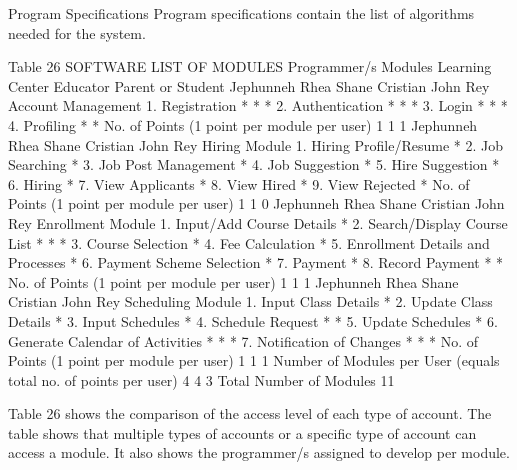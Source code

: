 Program Specifications  
Program specifications contain the list of algorithms needed for the system.

Table 26
SOFTWARE LIST OF MODULES
Programmer/s	Modules	Learning Center	Educator	Parent or Student
Jephunneh
Rhea Shane
Cristian 
John Rey	Account Management			
	      1. Registration	*	*	*
	      2. Authentication	*	*	*
	      3. Login	*	*	*
	      4. Profiling	*	*	 
No. of Points (1 point per module per user)	1	1	1
Jephunneh
Rhea Shane
Cristian
John Rey	Hiring Module	 
	      1. Hiring Profile/Resume	 	*	
	      2. Job Searching	 	*	 
	      3. Job Post Management	*	 	 
	      4. Job Suggestion	 	*	 
	      5. Hire Suggestion	*	 	 
	      6. Hiring	*	 	 
	      7. View Applicants	*		
	      8. View Hired	*		
	      9. View Rejected	*		
No. of Points (1 point per module per user)	1	1	0
 Jephunneh
Rhea Shane
Cristian
John Rey	Enrollment Module	 
	      1. Input/Add Course Details	*	 	 
	      2. Search/Display Course List	*	*	*
	      3. Course Selection	 	 	*
	      4. Fee Calculation	 	 	*
	      5. Enrollment Details and Processes	 	 	*
	      6. Payment Scheme Selection	 	 	*
	      7. Payment	 	 	*
	      8. Record Payment	*	 	*
No. of Points (1 point per module per user)	1	1	1
 Jephunneh
Rhea Shane
Cristian
John Rey	Scheduling Module	 
	      1. Input Class Details	*	 	 
	      2. Update Class Details	*	 	 
	      3. Input Schedules	*	 	 
	      4. Schedule Request	 	*	*
	      5. Update Schedules	*	 	 
	      6. Generate Calendar of Activities	*	*	*
	      7. Notification of Changes	*	*	*
No. of Points (1 point per module per user)	1	1	1
Number of Modules per User (equals total no. of points per user)	4	4	3
Total Number of Modules	11

Table 26 shows the comparison of the access level of each type of account. The table shows that multiple types of accounts or a specific type of account can access a module. It also shows the programmer/s assigned to develop per module.











